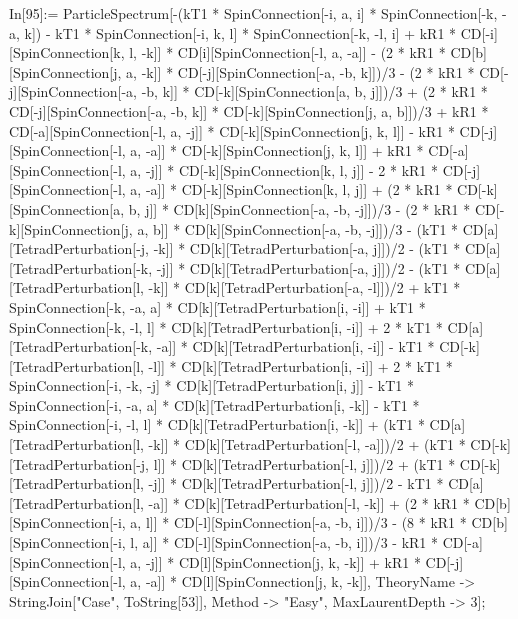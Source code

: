 In[95]:= ParticleSpectrum[-(kT1 * SpinConnection[-i, a, i] * SpinConnection[-k, -a, k]) - kT1 * SpinConnection[-i, k, l] * SpinConnection[-k, -l, i] + kR1 * CD[-i][SpinConnection[k, l, -k]] * CD[i][SpinConnection[-l, a, -a]] - (2 * kR1 * CD[b][SpinConnection[j, a, -k]] * CD[-j][SpinConnection[-a, -b, k]])/3 - (2 * kR1 * CD[-j][SpinConnection[-a, -b, k]] * CD[-k][SpinConnection[a, b, j]])/3 + (2 * kR1 * CD[-j][SpinConnection[-a, -b, k]] * CD[-k][SpinConnection[j, a, b]])/3 + kR1 * CD[-a][SpinConnection[-l, a, -j]] * CD[-k][SpinConnection[j, k, l]] - kR1 * CD[-j][SpinConnection[-l, a, -a]] * CD[-k][SpinConnection[j, k, l]] + kR1 * CD[-a][SpinConnection[-l, a, -j]] * CD[-k][SpinConnection[k, l, j]] - 2 * kR1 * CD[-j][SpinConnection[-l, a, -a]] * CD[-k][SpinConnection[k, l, j]] + (2 * kR1 * CD[-k][SpinConnection[a, b, j]] * CD[k][SpinConnection[-a, -b, -j]])/3 - (2 * kR1 * CD[-k][SpinConnection[j, a, b]] * CD[k][SpinConnection[-a, -b, -j]])/3 - (kT1 * CD[a][TetradPerturbation[-j, -k]] * CD[k][TetradPerturbation[-a, j]])/2 - (kT1 * CD[a][TetradPerturbation[-k, -j]] * CD[k][TetradPerturbation[-a, j]])/2 - (kT1 * CD[a][TetradPerturbation[l, -k]] * CD[k][TetradPerturbation[-a, -l]])/2 + kT1 * SpinConnection[-k, -a, a] * CD[k][TetradPerturbation[i, -i]] + kT1 * SpinConnection[-k, -l, l] * CD[k][TetradPerturbation[i, -i]] + 2 * kT1 * CD[a][TetradPerturbation[-k, -a]] * CD[k][TetradPerturbation[i, -i]] - kT1 * CD[-k][TetradPerturbation[l, -l]] * CD[k][TetradPerturbation[i, -i]] + 2 * kT1 * SpinConnection[-i, -k, -j] * CD[k][TetradPerturbation[i, j]] - kT1 * SpinConnection[-i, -a, a] * CD[k][TetradPerturbation[i, -k]] - kT1 * SpinConnection[-i, -l, l] * CD[k][TetradPerturbation[i, -k]] + (kT1 * CD[a][TetradPerturbation[l, -k]] * CD[k][TetradPerturbation[-l, -a]])/2 + (kT1 * CD[-k][TetradPerturbation[-j, l]] * CD[k][TetradPerturbation[-l, j]])/2 + (kT1 * CD[-k][TetradPerturbation[l, -j]] * CD[k][TetradPerturbation[-l, j]])/2 - kT1 * CD[a][TetradPerturbation[l, -a]] * CD[k][TetradPerturbation[-l, -k]] + (2 * kR1 * CD[b][SpinConnection[-i, a, l]] * CD[-l][SpinConnection[-a, -b, i]])/3 - (8 * kR1 * CD[b][SpinConnection[-i, l, a]] * CD[-l][SpinConnection[-a, -b, i]])/3 - kR1 * CD[-a][SpinConnection[-l, a, -j]] * CD[l][SpinConnection[j, k, -k]] + kR1 * CD[-j][SpinConnection[-l, a, -a]] * CD[l][SpinConnection[j, k, -k]], TheoryName -> StringJoin["Case", ToString[53]], Method -> "Easy", MaxLaurentDepth -> 3]; 